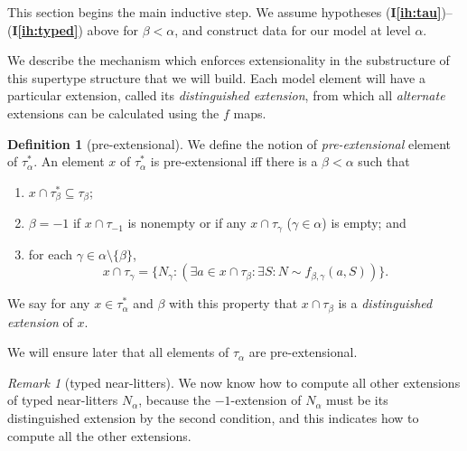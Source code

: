 \documentclass{article}
\newif\ifshowannotations
\newcommand{\annot}[1]{\ifshowannotations\marginpar{#1}\fi}
\theoremstyle{definition}
\newtheorem{definition}[theorem]{Definition}
\theoremstyle{remark}
\newtheorem{remark}[theorem]{Remark}
\newcommand{\ihref}[1]{(\textbf{I\ref{#1}})}
\begin{document}
{%

This section begins the main inductive step.
We assume hypotheses \ihref{ih:tau}--\ihref{ih:typed} above for $\beta < \alpha$, and construct data for our model at level $\alpha$.

We describe the mechanism which enforces extensionality in the substructure of this supertype structure that we will build.
Each model element will have a particular extension, called its {\em distinguished extension\/}, from which all {\em alternate\/} extensions can be calculated using the $f$ maps.


\begin{definition}[pre-extensional]\label{def:pre_extensional}
We define the notion of {\em pre-extensional\/} element of $\tau^*_\alpha$.   An element $x$ of $\tau^*_\alpha$ is pre-extensional iff there is a $\beta<\alpha$ such that
\begin{enumerate}
\item $x \cap \tau^*_\beta \subseteq \tau_\beta$;
\item $\beta=-1$ if $x \cap \tau_{-1}$ is nonempty or if any $x \cap \tau_\gamma$ ($\gamma \in \alpha$) is empty; and
\item for each $\gamma \in \alpha \setminus \{\beta\}$, $$x \cap \tau_\gamma= \{N_\gamma:(\exists a \in x\cap \tau_\beta:\exists S:N \sim f_{\beta,\gamma}(a,S))\}.$$
\end{enumerate}
We say for any $x \in \tau^*_\alpha$ and $\beta$ with this property that $x \cap \tau_\beta$ is a {\em distinguished extension\/} of $x$.
\end{definition}

We will ensure later that all elements of $\tau_\alpha$ are pre-extensional.
\begin{remark}[typed near-litters]\label{rk:typed_near_litters}
  We now know how to compute all other extensions of typed near-litters $N_\alpha$, because the $-1$-extension of $N_\alpha$ must be its distinguished extension by the second condition, and this indicates how to compute all the other extensions.


\end{remark}}
\end{document}
